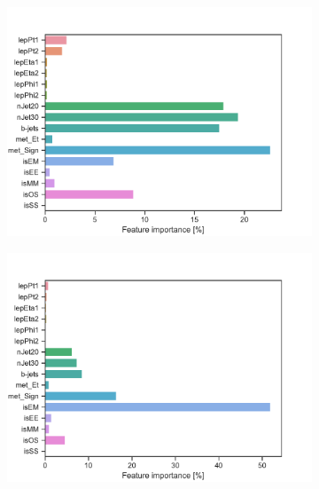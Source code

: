 \begin{figure}[H]
\begin{subfigure}[t!]{0.49\textwidth}
        \includegraphics[width = \textwidth]{Figures/WW/BDT/Low_level/Inter/featureImportance.pdf}
        \caption{}
        \label{fig:traintestscaled}
    \end{subfigure}
    \begin{subfigure}[t!]{0.49\textwidth}
        \includegraphics[width = \textwidth]{Figures/Mono_Z/ML/BDT/Low_level/Inter/featureImportance.pdf}
        \caption{}
        \label{fig:ROCBDTLow_low_level}
    \end{subfigure}
    \caption{}
    \label{fig:Non}
\end{figure}

